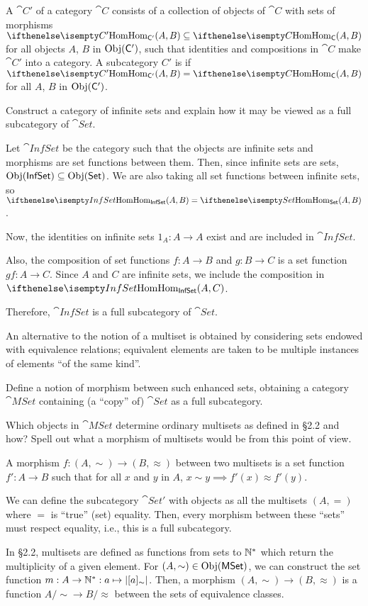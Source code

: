 \documentclass[notes,tikz]{agony}
\begin{document}
\begin{xca}
  A  $\cat C'$ of a category $\cat C$ consists of
  a collection of objects of $\cat C$ with sets of morphisms $\Hom[C'](A,B) \subseteq \Hom[C](A,B)$
  for all objects $A$, $B$ in $\operatorname{Obj}(\mathsf{C}')$,
  such that identities and compositions in $\cat C$ make $\cat C'$ into a category.
  A subcategory $C'$ is  if $\Hom[C'](A,B) = \Hom[C](A,B)$
  for all $A$, $B$ in $\operatorname{Obj}(\mathsf{C}')$.

  Construct a category of infinite sets
  and explain how it may be viewed as a full subcategory of $\cat{Set}$.
\end{xca}
\begin{sol}
  Let $\cat{InfSet}$ be the category such that
  the objects are infinite sets and morphisms are set functions between them.
  Then, since infinite sets are sets, $\operatorname{Obj}(\mathsf{InfSet}) \subseteq \operatorname{Obj}(\mathsf{Set})$.
  We are also taking all set functions between infinite sets,
  so $\Hom[InfSet](A,B) = \Hom[Set](A,B)$.

  Now, the identities on infinite sets $1_A : A \to A$
  exist and are included in $\cat{InfSet}$.

  Also, the composition of set functions $f : A \to B$ and $g : B \to C$
  is a set function $gf : A \to C$.
  Since $A$ and $C$ are infinite sets, we include the composition in $\Hom[InfSet](A,C)$.

  Therefore, $\cat{InfSet}$ is a full subcategory of $\cat{Set}$.
\end{sol}

\begin{xca}
  An alternative to the notion of a multiset is obtained by considering sets
  endowed with equivalence relations;
  equivalent elements are taken to be multiple instances of elements ``of the same kind''.

  Define a notion of morphism between such enhanced sets,
  obtaining a category $\cat{MSet}$ containing (a ``copy'' of) $\cat{Set}$ as a full subcategory.

  Which objects in $\cat{MSet}$ determine ordinary multisets as defined in \S2.2 and how?
  Spell out what a morphism of multisets would be from this point of view.
\end{xca}
\begin{sol}
  A morphism $f : (A,\sim) \to (B,\approx)$ between two multisets
  is a set function $f' : A \to B$ such that
  for all $x$ and $y$ in $A$, $x \sim y \implies f'(x) \approx f'(y)$.

  We can define the subcategory $\cat{Set'}$ with objects
  as all the multisets $(A,=)$ where $=$ is ``true'' (set) equality.
  Then, every morphism between these ``sets'' must respect equality, i.e.,
  this is a full subcategory.

  In \S2.2, multisets are defined as functions from sets to $\mathbb{N}^*$
  which return the multiplicity of a given element.
  For $(A,\sim) \in \operatorname{Obj}(\mathsf{MSet})$, we can construct the set function
  $m : A \to \mathbb{N}^* : a \mapsto \abs{[a]_\sim}$.
  Then, a morphism $(A,\sim) \to (B,\approx)$ is a function $A/{\sim} \to B/{\approx}$
  between the sets of equivalence classes.
\end{sol}
\end{document}
